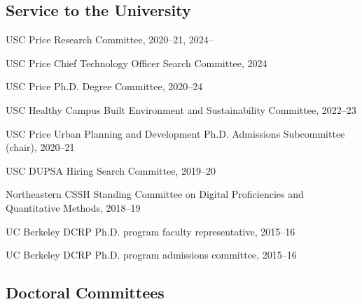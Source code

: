 \documentclass[11pt,letterpaper]{report}
\newcommand{\listitemspace}{0.25em}
\renewenvironment{itemize}
{\begin{list}{}{\setlength{\leftmargin}{0em}
                \setlength{\parskip}{0em}
                \setlength{\itemsep}{\listitemspace}
                \setlength{\parsep}{\listitemspace}}}
{\end{list}}
\begin{document}
    \subsection*{Service to the University}

    \begin{itemize}
        \item USC Price Research Committee, 2020--21, 2024--
        \item USC Price Chief Technology Officer Search Committee, 2024
        \item USC Price Ph.D. Degree Committee, 2020--24
        \item USC Healthy Campus Built Environment and Sustainability Committee, 2022--23
        \item USC Price Urban Planning and Development Ph.D. Admissions Subcommittee (chair), 2020--21
        \item USC DUPSA Hiring Search Committee, 2019--20
        \item Northeastern CSSH Standing Committee on Digital Proficiencies and Quantitative Methods, 2018--19
        \item UC Berkeley DCRP Ph.D. program faculty representative, 2015--16
        \item UC Berkeley DCRP Ph.D. program admissions committee, 2015--16

    \end{itemize}

    \subsection*{Doctoral Committees}
\end{document}
